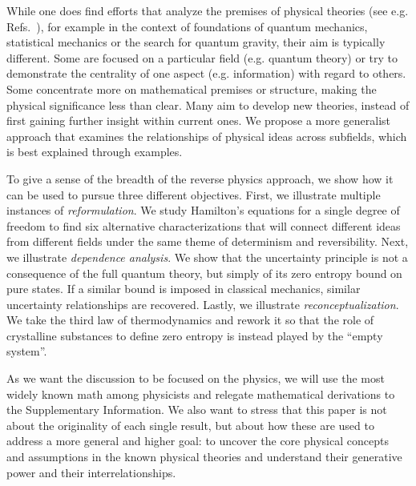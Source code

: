 \documentclass[10pt,twocolumn, nofootinbib]{revtex4-2}
\begin{document}
While one does find efforts that analyze the premises of physical theories (see e.g. Refs.~\cite{chiribella2011informational, selby2021reconstructing, giles2016mathematical, boyling1972axiomatic, PhysRev.101.860, Haag1964848, axiomaticQFT1975, masanes2019measurement, carcassi2021four}), for example in the context of foundations of quantum mechanics, statistical mechanics or the search for quantum gravity, their aim is typically different. Some are focused on a particular field (e.g. quantum theory) or try to demonstrate the centrality of one aspect (e.g. information) with regard to others. Some concentrate more on mathematical premises or structure, making the physical significance less than clear. Many aim to develop new theories, instead of first gaining further insight within current ones. We propose a more generalist approach that examines the relationships of physical ideas across subfields, which is best explained through examples. 


To give a sense of the breadth of the reverse physics approach, we show how it can be used to pursue three different objectives. First, we illustrate multiple instances of \emph{reformulation}. We study Hamilton's equations for a single degree of freedom to find six alternative characterizations that will connect different ideas from different fields under the same theme of determinism and reversibility. Next, we illustrate \emph{dependence analysis}. We show that the uncertainty principle is not a consequence of the full quantum theory, but simply of its zero entropy bound on pure states. If a similar bound is imposed in classical mechanics, similar uncertainty relationships are recovered. Lastly, we illustrate \emph{reconceptualization}. We take the third law of thermodynamics and rework it so that the role of crystalline substances to define zero entropy is instead played by the ``empty system''.

As we want the discussion to be focused on the physics, we will use the most widely known math among physicists and relegate mathematical derivations to the Supplementary Information. We also want to stress that this paper is not about the originality of each single result, but about how these are used to address a more general and higher goal: to uncover the core physical concepts and assumptions in the known physical theories and understand their generative power and their interrelationships. 




\end{document}
